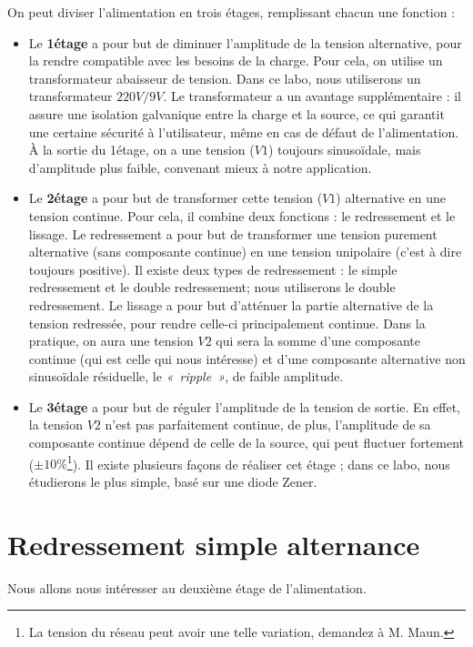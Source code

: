\documentclass{../template/labo}
\begin{document}
On peut diviser l'alimentation en trois étages, remplissant chacun une fonction :
\begin{itemize}
\item Le \textbf{1\ier étage} a pour but de diminuer l'amplitude de la tension alternative, pour la rendre compatible avec les besoins de la charge. Pour cela, on utilise un transformateur abaisseur de tension.
Dans ce labo, nous utiliserons un transformateur $220V/9V$.
Le transformateur a un avantage supplémentaire : il assure une isolation galvanique entre la charge et la source, ce qui garantit une certaine sécurité à l'utilisateur, même en cas de défaut de l'alimentation.
À la sortie du 1\ier étage, on a une tension ($V1$) toujours sinusoïdale, mais d'amplitude plus faible, convenant mieux à notre application.

\item Le \textbf{2\ieme étage} a pour but de transformer cette tension ($V1$) alternative en une tension continue. Pour cela, il combine deux fonctions : le redressement et le lissage.
Le redressement a pour but de transformer une tension purement alternative (sans composante continue) en une tension unipolaire (c'est à dire toujours positive). Il existe deux types de redressement : le simple redressement et le double redressement; nous utiliserons le double redressement.
Le lissage a pour but d'atténuer la partie alternative de la tension redressée, pour rendre celle-ci principalement continue.
Dans la pratique, on aura une tension $V2$ qui sera la somme d'une composante continue (qui est celle qui nous intéresse) et d'une composante alternative non sinusoïdale résiduelle, le \textit{«~ripple~»}, de faible amplitude.

\item Le \textbf{3\ieme étage} a pour but de réguler l'amplitude de la tension de sortie. En effet, la tension $V2$ n'est pas parfaitement continue, de plus, l'amplitude de sa composante continue dépend de celle de la source, qui peut fluctuer fortement ($\pm10\%$\footnote{La tension du réseau peut avoir une telle variation, demandez à M. Maun.}). %
Il existe plusieurs façons de réaliser cet étage ; dans ce labo, nous étudierons le plus simple, basé sur une diode Zener.
\end{itemize}


\section{Redressement simple alternance}
Nous allons nous intéresser au deuxième étage de l'alimentation.
\end{document}
